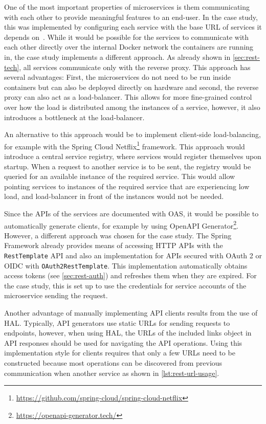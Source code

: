 One of the most important properties of microservices is them communicating with each other to provide meaningful features to an end-user.
In the case study, this was implemented by configuring each service with the base \ac{URL} of services it depends on~\cite{Taibi2020}.
While it would be possible for the services to communicate with each other directly over the internal Docker network the containers are running in, the case study implements a different approach.
As already shown in \autoref{sec:rest-tech}, all services communicate only with the reverse proxy.
This approach has several advantages:
First, the microservices do not need to be run inside containers but can also be deployed directly on hardware and second, the reverse proxy can also act as a load-balancer.
This allows for more fine-grained control over how the load is distributed among the instances of a service, however, it also introduces a bottleneck at the load-balancer.

An alternative to this approach would be to implement client-side load-balancing, for example with the Spring Cloud Netflix\footnote{\url{https://github.com/spring-cloud/spring-cloud-netflix}} framework.
This approach would introduce a central service registry, where services would register themselves upon startup.
When a request to another service is to be sent, the registry would be queried for an available instance of the required service.
This would allow pointing services to instances of the required service that are experiencing low load, and load-balancer in front of the instances would not be needed.

Since the \acp{API} of the services are documented with \ac{OAS}, it would be possible to automatically generate clients, for example by using Open\acs{API} Generator\footnote{\url{https://openapi-generator.tech/}}.
However, a different approach was chosen for the case study.
The Spring Framework already provides means of accessing \ac{HTTP} \acp{API} with the \texttt{RestTemplate} \ac{API} and also an implementation for \acp{API} secured with OAuth 2 or \ac{OIDC} with \texttt{OAuth2RestTemplate}.
This implementation automatically obtains access tokens (see \autoref{sec:rest-auth}) and refreshes them when they are expired.
For the case study, this is set up to use the credentials for service accounts of the microservice sending the request.

Another advantage of manually implementing \ac{API} clients results from the use of \ac{HAL}.
Typically, \ac{API} generators use static \acp{URL} for sending requests to endpoints, however, when using \ac{HAL}, the \acp{URL} of the included links object in \ac{API} responses should be used for navigating the \ac{API} operations.
Using this implementation style for clients requires that only a few \acp{URL} need to be constructed because most operations can be discovered from previous communication when another service as shown in \autoref{lst:rest-url-usage}.

